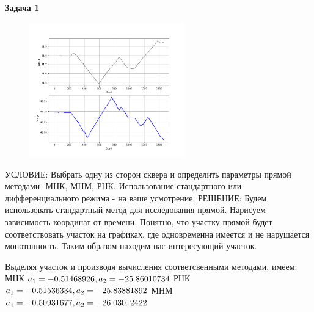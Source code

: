 \documentclass[a4paper,12pt]{article}
\begin{document}
\textbf{Задача 1}
\newline
\begin{figure}
    \includegraphics[width=0.6\textwidth]{Figure_1.png}
\end{figure}
УСЛОВИЕ:
\newline
Выбрать одну из сторон сквера и определить параметры
прямой методами- МНК, МНМ, РНК. Использование стандартного или
дифференциального режима - на ваше усмотрение.
\newline
РЕШЕНИЕ:
\newline
Будем использовать стандартный метод для исследования прямой. Нарисуем зависимость координат от времени. Понятно, что участку прямой будет соответствовать участок на графиках, где одновременна имеется и не нарушается монотонность. Таким образом находим нас интересующий участок.
\newline
\begin{figure}[H]
\end{figure}
Выделяя участок и производя вычисления соответсвенными методами, имеем:
\newline
МНК $a_1 = -0.51468926 , a_2 = -25.86010734 \newline$
РНК $a_1 = -0.51536334 , a_2 = -25.83881892 \newline$
МНМ $a_1 = -0.50931677 , a_2 = -26.03012422 \newline$
    
\end{document}
